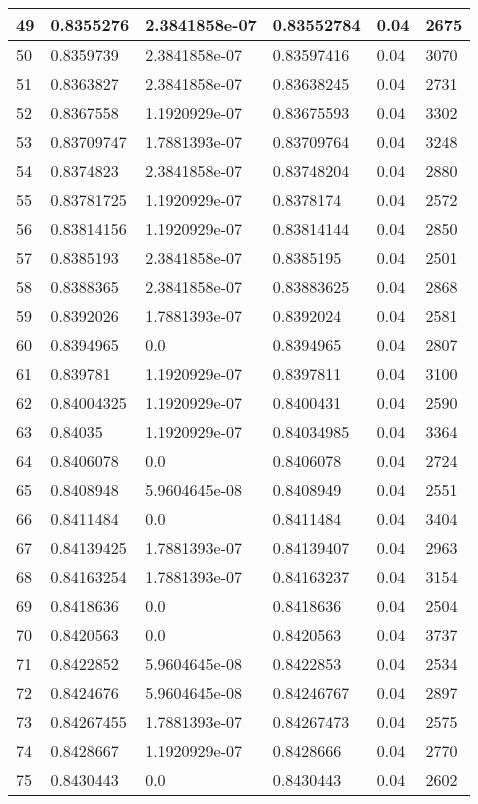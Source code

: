 \begin{longtable}{|l|l|l|l|l|l|}
49 & 0.8355276 & 2.3841858e-07 & 0.83552784 & 0.04 & 2675 \\ \hline 
50 & 0.8359739 & 2.3841858e-07 & 0.83597416 & 0.04 & 3070 \\ \hline 
51 & 0.8363827 & 2.3841858e-07 & 0.83638245 & 0.04 & 2731 \\ \hline 
52 & 0.8367558 & 1.1920929e-07 & 0.83675593 & 0.04 & 3302 \\ \hline 
53 & 0.83709747 & 1.7881393e-07 & 0.83709764 & 0.04 & 3248 \\ \hline 
54 & 0.8374823 & 2.3841858e-07 & 0.83748204 & 0.04 & 2880 \\ \hline 
55 & 0.83781725 & 1.1920929e-07 & 0.8378174 & 0.04 & 2572 \\ \hline 
56 & 0.83814156 & 1.1920929e-07 & 0.83814144 & 0.04 & 2850 \\ \hline 
57 & 0.8385193 & 2.3841858e-07 & 0.8385195 & 0.04 & 2501 \\ \hline 
58 & 0.8388365 & 2.3841858e-07 & 0.83883625 & 0.04 & 2868 \\ \hline 
59 & 0.8392026 & 1.7881393e-07 & 0.8392024 & 0.04 & 2581 \\ \hline 
60 & 0.8394965 & 0.0 & 0.8394965 & 0.04 & 2807 \\ \hline 
61 & 0.839781 & 1.1920929e-07 & 0.8397811 & 0.04 & 3100 \\ \hline 
62 & 0.84004325 & 1.1920929e-07 & 0.8400431 & 0.04 & 2590 \\ \hline 
63 & 0.84035 & 1.1920929e-07 & 0.84034985 & 0.04 & 3364 \\ \hline 
64 & 0.8406078 & 0.0 & 0.8406078 & 0.04 & 2724 \\ \hline 
65 & 0.8408948 & 5.9604645e-08 & 0.8408949 & 0.04 & 2551 \\ \hline 
66 & 0.8411484 & 0.0 & 0.8411484 & 0.04 & 3404 \\ \hline 
67 & 0.84139425 & 1.7881393e-07 & 0.84139407 & 0.04 & 2963 \\ \hline 
68 & 0.84163254 & 1.7881393e-07 & 0.84163237 & 0.04 & 3154 \\ \hline 
69 & 0.8418636 & 0.0 & 0.8418636 & 0.04 & 2504 \\ \hline 
70 & 0.8420563 & 0.0 & 0.8420563 & 0.04 & 3737 \\ \hline 
71 & 0.8422852 & 5.9604645e-08 & 0.8422853 & 0.04 & 2534 \\ \hline 
72 & 0.8424676 & 5.9604645e-08 & 0.84246767 & 0.04 & 2897 \\ \hline 
73 & 0.84267455 & 1.7881393e-07 & 0.84267473 & 0.04 & 2575 \\ \hline 
74 & 0.8428667 & 1.1920929e-07 & 0.8428666 & 0.04 & 2770 \\ \hline 
75 & 0.8430443 & 0.0 & 0.8430443 & 0.04 & 2602 \\ \hline 
\end{longtable}